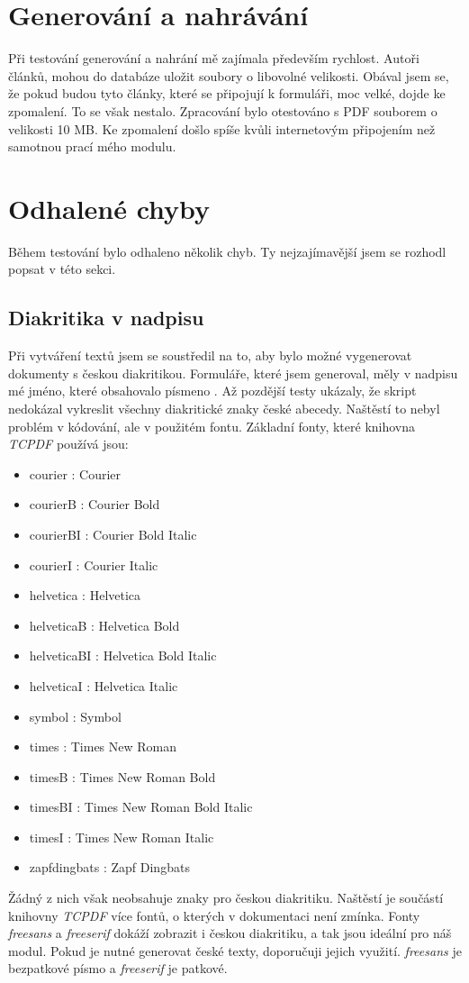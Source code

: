 \documentclass[czech,BP]{thesiskiv}
\begin{document}
\section{Generování a nahrávání}
Při testování generování a nahrání mě zajímala především rychlost. Autoři článků, mohou do databáze uložit soubory o libovolné velikosti. Obával jsem se, že pokud budou tyto články, které se připojují k formuláři, moc velké, dojde ke zpomalení. To se však nestalo. Zpracování bylo otestováno s PDF souborem o velikosti 10 MB. Ke zpomalení došlo spíše kvůli internetovým připojením než samotnou prací mého modulu. 
\section{Odhalené chyby}
Během testování bylo odhaleno několik chyb. Ty nejzajímavější jsem se rozhodl popsat v této sekci.
\subsection{Diakritika v nadpisu}
Při vytváření textů jsem se soustředil na to, aby bylo možné vygenerovat dokumenty s českou diakritikou. Formuláře, které jsem generoval, měly v nadpisu mé jméno, které obsahovalo písmeno . Až pozdější testy ukázaly, že skript nedokázal vykreslit všechny diakritické znaky české abecedy. Naštěstí to nebyl problém v kódování, ale v použitém fontu. Základní fonty, které knihovna \emph{TCPDF} používá jsou:
\begin{itemize}
\item courier : Courier
\item courierB : Courier Bold
\item courierBI : Courier Bold Italic
\item courierI : Courier Italic
\item helvetica : Helvetica
\item helveticaB : Helvetica Bold
\item helveticaBI : Helvetica Bold Italic
\item helveticaI : Helvetica Italic
\item symbol : Symbol
\item times : Times New Roman
\item timesB : Times New Roman Bold
\item timesBI : Times New Roman Bold Italic
\item timesI : Times New Roman Italic
\item zapfdingbats : Zapf Dingbats
\end{itemize}
Žádný z nich však neobsahuje znaky pro českou diakritiku. Naštěstí je součástí knihovny \emph{TCPDF} více fontů, o kterých v dokumentaci není zmínka. Fonty \emph{freesans} a \emph{freeserif} dokáží zobrazit i českou diakritiku, a tak jsou ideální pro náš modul. Pokud je nutné generovat české texty, doporučuji jejich využití. \emph{freesans} je bezpatkové písmo a \emph{freeserif} je patkové.
\end{document}
